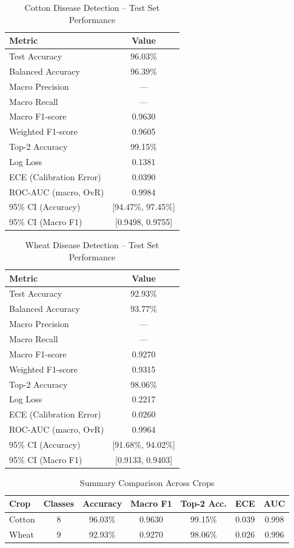 \documentclass[12pt,a4paper]{report}
\begin{document}
\begin{table}[H]
\centering
\caption{Cotton Disease Detection -- Test Set Performance}
\label{tab:cotton-performance}
\begin{tabular}{lc}
\toprule
Metric & Value \\
\midrule
Test Accuracy & 96.03\% \\
Balanced Accuracy & 96.39\% \\
Macro Precision & --- \\
Macro Recall & --- \\
Macro F1-score & 0.9630 \\
Weighted F1-score & 0.9605 \\
Top-2 Accuracy & 99.15\% \\
Log Loss & 0.1381 \\
ECE (Calibration Error) & 0.0390 \\
ROC-AUC (macro, OvR) & 0.9984 \\
95\% CI (Accuracy) & [94.47\%, 97.45\%] \\
95\% CI (Macro F1) & [0.9498, 0.9755] \\
\bottomrule
\end{tabular}
\end{table}

\begin{table}[H]
\centering
\caption{Wheat Disease Detection -- Test Set Performance}
\label{tab:wheat-performance}
\begin{tabular}{lc}
\toprule
Metric & Value \\
\midrule
Test Accuracy & 92.93\% \\
Balanced Accuracy & 93.77\% \\
Macro Precision & --- \\
Macro Recall & --- \\
Macro F1-score & 0.9270 \\
Weighted F1-score & 0.9315 \\
Top-2 Accuracy & 98.06\% \\
Log Loss & 0.2217 \\
ECE (Calibration Error) & 0.0260 \\
ROC-AUC (macro, OvR) & 0.9964 \\
95\% CI (Accuracy) & [91.68\%, 94.02\%] \\
95\% CI (Macro F1) & [0.9133, 0.9403] \\
\bottomrule
\end{tabular}
\end{table}

\begin{table}[H]
\centering
\caption{Summary Comparison Across Crops}
\label{tab:unified-performance}
\begin{tabular}{lcccccc}
\toprule
Crop & Classes & Accuracy & Macro F1 & Top-2 Acc. & ECE & AUC \\
\midrule
Cotton & 8 & 96.03\% & 0.9630 & 99.15\% & 0.039 & 0.998 \\
Wheat & 9 & 92.93\% & 0.9270 & 98.06\% & 0.026 & 0.996 \\
\bottomrule
\end{tabular}
\end{table}
\end{document}
